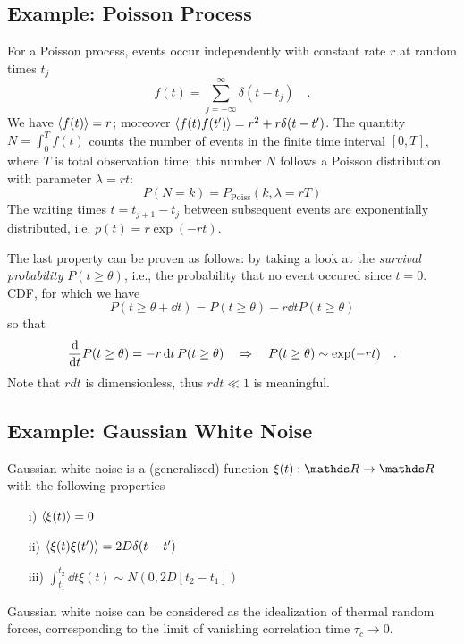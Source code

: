 \documentclass{notebook}
\begin{document}
\subsection*{Example: Poisson Process}
%
\begin{theorem}
	For a Poisson process, events occur independently with constant rate $r$ at random times $t_j$
	\begin{equation}
	f(t) = \sum_{j = -\infty}^{\infty}{\delta(t-t_j)} \quad.
	\end{equation}
	We have $\expval{f(t)} = r$; moreover $\expval{f(t)f(t')} = r^2 + r\delta(t-t')$.
	The quantity $N = \int_0^T f(t)$ counts the number of events in the finite time interval $[0,T]$, 
	where $T$ is total observation time; this number $N$ follows a Poisson distribution with parameter $\lambda = rt$:
	\begin{equation}
		P(N=k) = P_\mathrm{Poiss}(k, \lambda = r T)
	\end{equation}
	The waiting times $t = t_{j+1} - t_j$ between subsequent events are exponentially distributed, 
	i.e. $p(t) = r \exp(-rt)$. 
\end{theorem}
%
The last property can be proven as follows: 
by taking a look at the \textit{survival probability} $P(t \geq \theta)$, 
i.e., the probability that no event occured since $t=0$.
CDF, for which we have 
\begin{equation*}
	P(t \geq \theta + \dd{t}) = P(t \geq \theta) - r \dd{t} P(t \geq \theta)
\end{equation*}
so that
\begin{equation*}
	\dv{t} P(t \geq \theta) = - r \dd{t} P(t \geq \theta) \quad \Rightarrow \quad P(t \geq \theta) \sim \exp(-r t) \quad.
\end{equation*}
Note that $r dt$ is dimensionless, thus $r dt \ll 1$ is meaningful. 


\subsection*{Example: Gaussian White Noise}

%
\begin{theorem}
	Gaussian white noise is a (generalized) function $\xi(t):\R \to \R$ with the following properties
	\begin{itemize}
		\item[i)]{$\expval{\xi(t)} = 0$}
		\item[ii)]{$\expval{\xi(t) \xi(t')} = 2D \delta(t-t')$}
		\item[iii)]{$\int_{t_1}^{t_2} \dd{t} \xi(t) \sim N(0,2D[t_2-t_1])$}
	\end{itemize}
	Gaussian white noise can be considered as the idealization of thermal random forces, corresponding to the limit of vanishing correlation time $\tau_c \to 0$.
\end{theorem}
%
\end{document}
